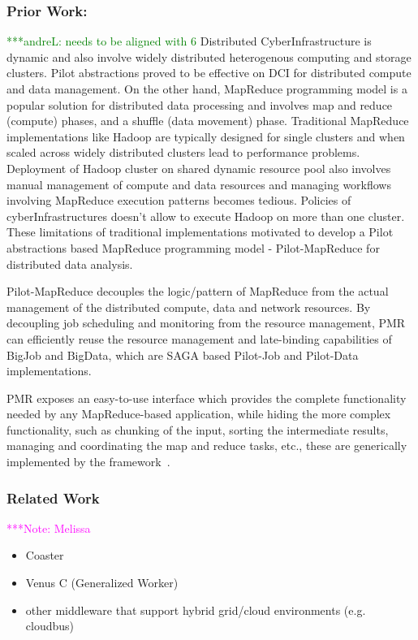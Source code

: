 \documentclass[times]{cpeauth}
\newcommand{\alnote}[1]{ {\textcolor{green} { ***andreL: #1 }}}
\newcommand{\note}[1]{ {\textcolor{magenta} { ***Note: #1 }}}
\newcommand{\alnote}[1]{}
\newcommand{\note}[1]{}
\begin{document}
\subsubsection*{Prior Work:}
\alnote{needs to be aligned with 6}
Distributed CyberInfrastructure is dynamic and also involve widely distributed
heterogenous computing and storage clusters. Pilot abstractions proved to be
effective on DCI for distributed compute and data management. On the other
hand, MapReduce programming model is a popular solution for distributed data
processing and involves map and reduce (compute) phases, and a shuffle (data
movement) phase. Traditional MapReduce implementations like Hadoop are
typically designed for single clusters and when scaled across widely
distributed clusters lead to performance problems. Deployment of Hadoop
cluster on shared dynamic resource pool also involves manual management of
compute and data resources and managing workflows involving MapReduce
execution patterns becomes tedious. Policies of cyberInfrastructures doesn't
allow to execute Hadoop on more than one cluster. These limitations of
traditional implementations motivated to develop a Pilot abstractions based
MapReduce programming model - Pilot-MapReduce for distributed data analysis.

Pilot-MapReduce decouples the logic/pattern of MapReduce from the actual
management of the distributed compute, data and network resources. By
decoupling job scheduling and monitoring from the resource management, PMR can
efficiently reuse the resource management and late-binding capabilities of
BigJob and BigData, which are SAGA based Pilot-Job and Pilot-Data
implementations.

PMR exposes an easy-to-use interface which provides the complete functionality
needed by any MapReduce-based application, while hiding the more complex
functionality, such as chunking of the input, sorting the intermediate
results, managing and coordinating the map and reduce tasks, etc., these are
generically implemented by the
framework~\cite{Mantha:2012:PEF:2287016.2287020}.



\subsubsection*{Related Work} 
\note{Melissa}

\begin{itemize}
	\item Coaster
	\item Venus C (Generalized Worker)
	\item other middleware that support hybrid grid/cloud environments (e.g. cloudbus)
\end{itemize}
\end{document}
